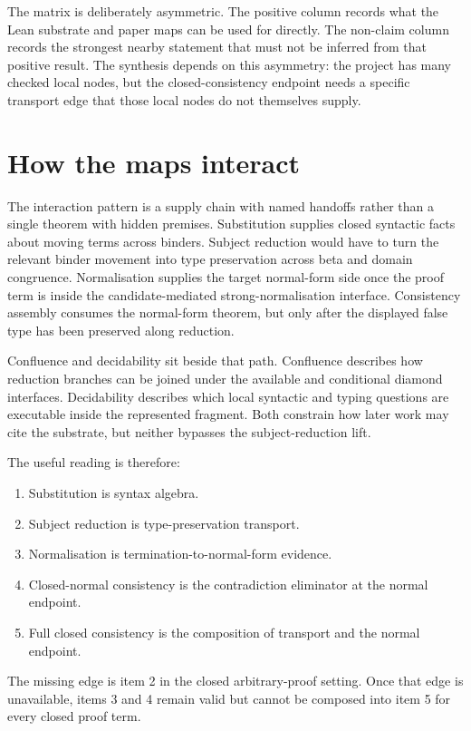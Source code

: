 The matrix is deliberately asymmetric. The positive column records what the
Lean substrate and paper maps can be used for directly. The non-claim column
records the strongest nearby statement that must not be inferred from that
positive result. The synthesis depends on this asymmetry: the project has many
checked local nodes, but the closed-consistency endpoint needs a specific
transport edge that those local nodes do not themselves supply.

\section{How the maps interact}
\label{sec:metacic-audit-synthesis-interaction}

The interaction pattern is a supply chain with named handoffs rather than a
single theorem with hidden premises. Substitution supplies closed syntactic
facts about moving terms across binders. Subject reduction would have to turn
the relevant binder movement into type preservation across beta and domain
congruence. Normalisation supplies the target normal-form side once the proof
term is inside the candidate-mediated strong-normalisation interface.
Consistency assembly consumes the normal-form theorem, but only after the
displayed false type has been preserved along reduction.

Confluence and decidability sit beside that path. Confluence describes how
reduction branches can be joined under the available and conditional diamond
interfaces. Decidability describes which local syntactic and typing questions
are executable inside the represented fragment. Both constrain how later work
may cite the substrate, but neither bypasses the subject-reduction lift.

The useful reading is therefore:

\begin{enumerate}
\item Substitution is syntax algebra.
\item Subject reduction is type-preservation transport.
\item Normalisation is termination-to-normal-form evidence.
\item Closed-normal consistency is the contradiction eliminator at the normal
  endpoint.
\item Full closed consistency is the composition of transport and the normal
  endpoint.
\end{enumerate}

The missing edge is item 2 in the closed arbitrary-proof setting. Once that
edge is unavailable, items 3 and 4 remain valid but cannot be composed into
item 5 for every closed proof term.

